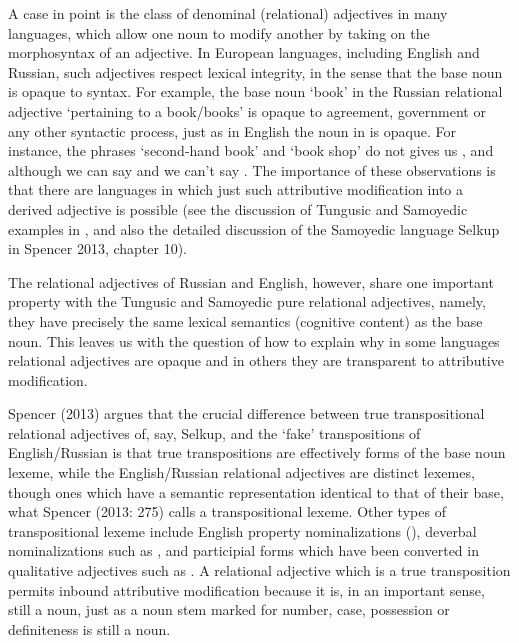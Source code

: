\documentclass[output=paper,
modfonts
]{LSP/langsci}
\begin{document}
A case in point is the class of denominal (relational) adjectives in many languages, which allow one noun to modify another by taking on the morphosyntax of an adjective. In European languages, including English and Russian, %
such adjectives respect lexical integrity, in the sense that the base noun is opaque  to syntax. For example, the base noun  ‘book’ in the Russian relational adjective  ‘pertaining to a book/books’ is opaque to agreement, government or any other syntactic process, just as in English  the noun  in  is opaque. For instance, the phrases  ‘second-hand book’ and  ‘book shop’ do not gives us , and although we can say  and  we can’t say . The importance of these observations is that there are languages  in which just such attributive modification into a derived adjective is possible  (see the discussion of Tungusic and Samoyedic examples in \cite{Nikolaeva08}, and also the detailed discussion of the Samoyedic language Selkup %
in Spencer 2013, chapter 10).

The relational adjectives of Russian and English, however, share  one important property with the Tungusic and Samoyedic  pure relational adjectives, namely, they have precisely the same lexical semantics (cognitive content) as the base noun. This leaves us with the question of how to explain why in some languages relational adjectives are opaque and in others they are transparent to attributive modification.   

Spencer (2013) argues that the crucial difference between true transpositional relational adjectives of, say, Selkup,  and the ‘fake’ transpositions of English/Russian is that true transpositions are effectively forms of the base noun lexeme, while the English/Russian relational adjectives are distinct lexemes, though ones which have a semantic representation identical to that of their base, what Spencer (2013: 275) calls a transpositional lexeme. Other types of transpositional lexeme include English property nominalizations (), deverbal nominalizations such as , and participial forms which have been converted in qualitative adjectives such as .  A relational adjective which is a true transposition permits inbound attributive modification because it is, in an important sense, still a noun, just as a noun stem marked for number, case, possession or definiteness is still a noun. 
\end{document}
